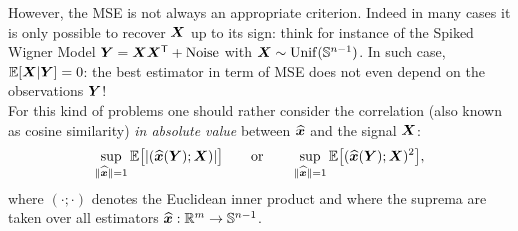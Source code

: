 \documentclass[12pt,nocut]{article}
\begin{document}
However, the MSE is not always an appropriate criterion. Indeed in many cases it is only possible to recover ${\boldsymbol X}$ up to its sign: think for instance of the Spiked Wigner Model ${\boldsymbol Y} = {\boldsymbol X}{\boldsymbol X}^{{\sf T}} + {\rm Noise}$ with ${\boldsymbol X} \sim {\rm Unif}(\mathbb{S}^{n-1})$. In such case, $\mathbb{E}[{\boldsymbol X}|{\boldsymbol Y}] = 0$: the best estimator in term of MSE does not even depend on the observations ${\boldsymbol Y}$!
\\

For this kind of problems one should rather consider the correlation (also known as cosine similarity) \textit{in absolute value} between $\widehat{{\boldsymbol x}}$ and the signal ${\boldsymbol X}$:
\begin{equation}\label{eq:correlation_metric}
\sup_{\|\widehat{{\boldsymbol x}}\| = 1} \mathbb{E}\big[|(\widehat{{\boldsymbol x}}({\boldsymbol Y}); {\boldsymbol X})|\big]
\qquad \text{or} \qquad
\sup_{\|\widehat{{\boldsymbol x}}\| = 1} \mathbb{E}\big[(\widehat{{\boldsymbol x}}({\boldsymbol Y}); {\boldsymbol X})^2\big],
\end{equation}
where $(\cdot; \cdot)$ denotes the Euclidean inner product and where the suprema are taken over all estimators $\widehat{{\boldsymbol x}}: \mathbb{R}^m \to \mathbb{S}^{n-1}$.
\\
\end{document}
